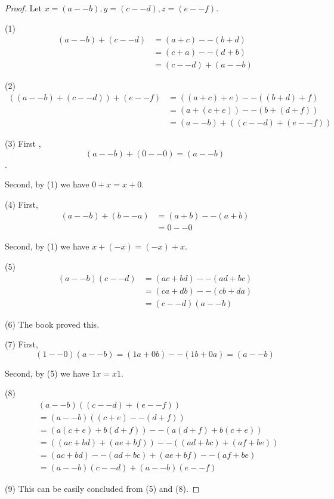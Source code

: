 \begin{proof}
Let $x=(a--b),y=(c--d),z=(e--f)$.

(1)
\begin{align*}
(a--b) + (c--d) 
&= (a+c) -- (b+d) \\
&= (c+a) -- (d+b) \\
&= (c--d) + (a--b)
\end{align*}

(2)
\begin{align*}
((a--b) + (c--d)) + (e--f)
&= ((a+c)+e) -- ((b+d)+f) \\
&= (a+(c+e)) -- (b+(d+f)) \\
&= (a--b) + ((c--d) + (e--f))
\end{align*}

(3)
First ,
\[
(a--b) + (0--0) = (a--b)
\].

Second, by (1) we have $0+x=x+0$.

(4)
First, 
\begin{align*}
(a--b) + (b--a) 
&= (a+b) -- (a+b) \\
&= 0 -- 0 \tag{$a+b+0=a+b+0$}
\end{align*}

Second, by (1) we have $x+(-x) = (-x) + x$.

(5)
\begin{align*}
(a--b)(c--d)
&= (ac + bd) -- (ad + bc) \\
&= (ca + db) -- (cb + da) \\
&= (c--d)(a--b)
\end{align*}

(6)
The book proved this.

(7)
First,
\[
(1--0)(a--b) = (1a + 0b) -- (1b+0a) = (a--b)
\]

Second, by (5) we have $1x=x1$.

(8)
\begin{align*}
&(a--b)((c--d)+(e--f)) \\
&= (a--b)((c+e)--(d+f)) \\
&= (a(c+e) + b(d+f)) -- (a(d+f) + b(c+e)) \\
&= ((ac + bd)+(ae + bf)) -- ((ad + bc)+(af + be)) \\
&= (ac+bd)--(ad+bc) + (ae+bf)--(af+be) \\
&= (a--b)(c--d) + (a--b)(e--f)
\end{align*}

(9)
This can be easily concluded from (5) and (8).
\end{proof}

